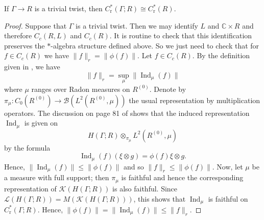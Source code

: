 \documentclass[12pt,a4paper]{amsart}
\newcommand{\field}[1]{\mathbb{#1}}
\newcommand{\CC}{\field{C}}
\newcommand{\Bb}{\mathcal{B}}
\newcommand{\Kk}{\mathcal{K}}
\newcommand{\Ll}{\mathcal{L}}
\newcommand{\red}{\operatorname{r}}
\newcommand{\Ind}{\operatorname{Ind}}
\newcommand{\tgcsa}[2]{\ensuremath{C^*_{\red}(#1 ; #2)}}
\begin{document}
\begin{lemma}\label{lem:C* trivial twist}
If $\Gamma \to R$ is a trivial twist, then $\tgcsa{\Gamma}{R}
\cong C^*_{\red}(R)$.
\end{lemma}
\begin{proof}
Suppose that $\Gamma$ is a trivial twist.  Then we may identify
$L$ and $\CC \times R$ and therefore $C_c(R,L)$ and $C_c(R)$.
It is routine to check that this identification preserves the
$*$-algebra structure defined above. So we just need to check
that for $f \in C_c(R)$ we have $\| f \|_r = \| \phi(f) \|$.
Let $f \in C_c(R)$. By the definition given in
\cite[p.~82]{Renault1980}, we have
\[\textstyle
\| f \|_r = \sup_\mu \| \Ind_\mu (f) \|
\]
where $\mu$ ranges over Radon measures on $R^{(0)}$. Denote by $\pi_\mu : C_0(R^{(0)}) \to
\Bb(L^2(R^{(0)}, \mu))$ the usual representation by multiplication operators. The discussion on
page 81 of \cite{Renault1980}  shows that the induced representation $\Ind_\mu$ is given on
\[
H(\Gamma;R) \otimes_{\pi_\mu} L^2(R^{(0)}, \mu)
\]
by the formula
\[
\Ind_\mu(f)(\xi \otimes g) = \phi(f)\xi\otimes g.
\]
Hence, $ \| \Ind_\mu (f) \| \le \| \phi(f) \|$ %
and so $\| f \|_r \le \| \phi(f) \|$. Now, let $\mu$ be a
measure with full  support; then $\pi_\mu$ is faithful and
hence the corresponding representation of $\Kk(H(\Gamma;R))$ is
also faithful.  Since $\Ll(H(\Gamma; R)) =
M(\Kk(H(\Gamma;R)))$, this shows that $\Ind_\mu$ is faithful on
$\tgcsa{\Gamma}{R}$.  Hence, $\| \phi(f)\| = \| \Ind_\mu(f)\|
\le \| f \|_r$.
\end{proof}
\end{document}
